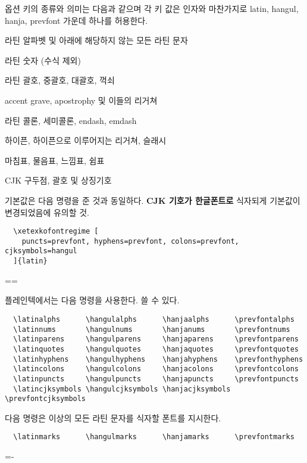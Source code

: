 \documentclass[a4paper]{article}
\def\grayvrule{{\color{white!80!black}\vrule width 2pt}}
\newenvironment{plaintex}
  {\setbox0=\vbox\bgroup\hsize=\dimexpr\textwidth-12pt\relax\medskip\par\small}
  {\par\medskip\egroup \par\medskip\par
    \dimen0=\dimexpr\pagegoal-\pagetotal\relax
    \ifdim\ht0<\dimen0
      \hbox{\grayvrule\kern10pt\box0}%
    \else
      \setbox2=\vsplit0 to\dimen0
      \lineskip=0pt
      \ifvoid2 \else\hbox{\grayvrule\kern10pt\box2}\fi
      \ifvoid0 \else\hbox{\grayvrule\kern10pt\box0}\fi
    \fi \par\medskip\par }
\def\hemph#1{\textsf{\bfseries #1}}
\def\hparen#1{{\small\hangulparens(#1)}}
\begin{document}
옵션 키의 종류와 의미는 다음과 같으며 각 키 값은 인자와 마찬가지로
latin, hangul, hanja, prevfont 가운데 하나를 허용한다.
\begin{description}\itemsep0pt\hangulparens
\item[alphs] 라틴 알파벳 및 아래에 해당하지 않는 모든 라틴 문자
\item[nums] 라틴 숫자 \hparen{수식 제외}
\item[parens] 라틴 괄호, 중괄호, 대괄호, 꺽쇠
\item[quotes] accent grave, apostrophy 및 이들의 리거쳐
\item[colons] 라틴 콜론, 세미콜론, endash, emdash
\item[hyphens] 하이픈, 하이픈으로 이루어지는 리거쳐, 슬래시
\item[puncts] 마침표, 물음표, 느낌표, 쉼표
\item[cjksymbols] CJK 구두점, 괄호 및 상징기호
\end{description}

기본값은 다음 명령을 준 것과 동일하다. \hemph{CJK 기호가 한글폰트로}
식자되게 기본값이 변경되었음에 유의할 것.
\begin{verbatim}
  \xetexkofontregime [
    puncts=prevfont, hyphens=prevfont, colons=prevfont, cjksymbols=hangul
  ]{latin}
\end{verbatim}

\begin{plaintex}
플레인텍에서는 다음 명령을 사용한다.  쓸 수 있다.
\begin{verbatim}
  \latinalphs      \hangulalphs      \hanjaalphs      \prevfontalphs
  \latinnums       \hangulnums       \hanjanums       \prevfontnums
  \latinparens     \hangulparens     \hanjaparens     \prevfontparens
  \latinquotes     \hangulquotes     \hanjaquotes     \prevfontquotes
  \latinhyphens    \hangulhyphens    \hanjahyphens    \prevfonthyphens
  \latincolons     \hangulcolons     \hanjacolons     \prevfontcolons
  \latinpuncts     \hangulpuncts     \hanjapuncts     \prevfontpuncts
  \latincjksymbols \hangulcjksymbols \hanjacjksymbols \prevfontcjksymbols
\end{verbatim}
다음 명령은 이상의 모든 라틴 문자를 식자할 폰트를 지시한다.
\begin{verbatim}
  \latinmarks      \hangulmarks      \hanjamarks      \prevfontmarks
\end{verbatim}
\end{plaintex}
\end{document}
